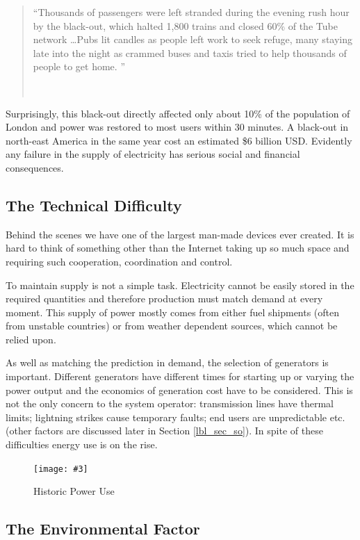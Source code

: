 \documentclass[a4paper,oneside,12pt]{report}
\newcommand{\image}[3] {
  \begin{figure}
    \begin{center}
      \texttt{[image: \#3]}
      \caption{#2}
      \label{#1}
    \end{center}
  \end{figure}
}
\newcommand{\tmpquotecite}{}%
\newenvironment{myquote}[1][]
{\renewcommand{\tmpquotecite}{#1}\begin{quote}\begin{itshape}``}
{''\end{itshape}~{\normalfont~\tmpquotecite}\end{quote}}
\begin{document}
\begin{myquote}[\cite{BBC2003}]Thousands of passengers were left stranded during the evening rush hour by the black-out, which halted 1,800 trains and closed 60\% of the Tube network \ldots Pubs lit candles as people left work to seek refuge, many staying late into the night as crammed buses and taxis tried to help thousands of people to get home.
\end{myquote}

Surprisingly, this black-out directly affected only about 10\% of the population of London and power was restored to most users within 30 minutes. A black-out in north-east America in the same year cost an estimated \$6 billion USD. Evidently any failure in the supply of electricity has serious social and financial consequences.

\subsection{The Technical Difficulty}

Behind the scenes we have one of the largest man-made devices ever created. It is hard to think of something other than the Internet taking up so much space and requiring such cooperation, coordination and control.

To maintain supply is not a simple task. Electricity cannot be easily stored in the required quantities and therefore production must match demand at every moment. This supply of power mostly comes from either fuel shipments (often from unstable countries) or from weather dependent sources, which cannot be relied upon.

As well as matching the prediction in demand, the selection of generators is important. Different generators have different times for starting up or varying the power output and the economics of generation cost have to be considered. This is not the only concern to the system operator: transmission lines have thermal limits; lightning strikes cause temporary faults; end users are unpredictable etc. (other factors are discussed later in Section \ref{lbl_sec_so}). In spite of these difficulties energy use is on the rise.

\image{HistoricPowerUse}{Historic Power Use}{historicpoweruse.png}

\subsection{The Environmental Factor}
\end{document}
